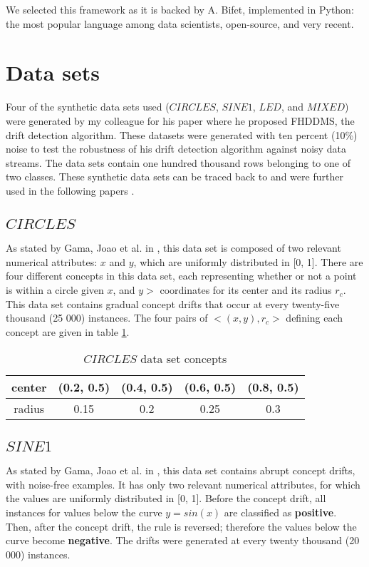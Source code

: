 We selected this framework as it is backed by A. Bifet, implemented in Python: the most popular language among data scientists, open-source, and very recent.

\section{Data sets}
Four of the synthetic data sets used ($CIRCLES$, $SINE1$, $LED$, and $MIXED$) were generated by my colleague for his paper \cite{pesaranghader2016fast} where he proposed FHDDMS, the drift detection algorithm. These datasets were generated with ten percent (10\%) noise to test the robustness of his drift detection algorithm against noisy data streams. The data sets contain one hundred thousand rows belonging to one of two classes. These synthetic data sets can be traced back to \cite{10.1007/3-540-59286-5_74} and were further used in the following papers \cite{nishida2007detecting, gama2004learning, baena2006early}. %

\subsection{$CIRCLES$}
As stated by Gama, Joao et al. in \cite{gama2004learning}, this data set is composed of two relevant numerical attributes: $x$ and $y$, which are uniformly distributed in [0, 1]. There are four different concepts in this data set, each representing whether or not a point is within a circle given $x$, and $y>$ coordinates for its center and its radius $r_c$. This data set contains gradual concept drifts that occur at every twenty-five thousand (25 000) instances. The four pairs of $<(x,y), r_c>$ defining each concept are given in table \ref{table:circle_concepts}.

\begin{table}[]
\centering
\caption{\label{table:circle_concepts}$CIRCLES$ data set concepts}
\begin{tabular}{|c|c|c|c|c|}
\hline
center & (0.2, 0.5) & (0.4, 0.5) & (0.6, 0.5) & (0.8, 0.5) \\ \hline
radius & 0.15       & 0.2        & 0.25       & 0.3        \\ \hline
\end{tabular}
\end{table}

\subsection{$SINE1$}
As stated by Gama, Joao et al. in \cite{gama2004learning}, this data set contains abrupt concept drifts, with noise-free examples. It has only two relevant numerical attributes, for which the values are uniformly distributed in [0, 1]. Before the concept drift, all instances for values below the curve $y = sin(x)$ are classified as \textbf{positive}. Then, after the concept drift, the rule is reversed; therefore the values below the curve become \textbf{negative}. The drifts were generated at every twenty thousand (20 000) instances.

